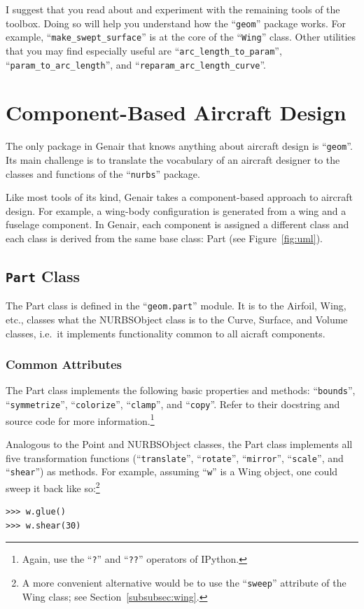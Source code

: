 \documentclass[]{article}
\begin{document}
I suggest that you read about and experiment with the remaining tools of 
the toolbox.  Doing so will help you understand how the 
``\texttt{geom}'' package works.  For example, 
``\texttt{make\_swept\_surface}'' is at the core of the 
``\texttt{Wing}'' class.  Other utilities that you may find especially 
useful are ``\texttt{arc\_length\_to\_param}'', 
``\texttt{param\_to\_arc\_length}'', and 
``\texttt{reparam\_arc\_length\_curve}''.


\section{Component-Based Aircraft Design}
\label{cha:geom}

The only package in Genair that knows anything about aircraft design is 
``\texttt{geom}''.  Its main challenge is to translate the vocabulary of 
an aircraft designer to the classes and functions of the 
``\texttt{nurbs}'' package.

Like most tools of its kind, Genair takes a component-based approach to 
aircraft design.  For example, a wing-body configuration is generated 
from a wing and a fuselage component.  In Genair, each component is 
assigned a different class and each class is derived from the same base 
class: Part (see Figure~\ref{fig:uml}).

\subsection{\texttt{Part} Class}
\label{subsec:part}

The Part class is defined in the ``\texttt{geom.part}'' module.  It is 
to the Airfoil, Wing, etc., classes what the NURBSObject class is to the 
Curve, Surface, and Volume classes, i.e.\ it implements functionality 
common to all aicraft components.

\subsubsection{Common Attributes}
\label{subsubsec:methods}

The Part class implements the following basic properties and methods: 
``\texttt{bounds}'', ``\texttt{symmetrize}'', ``\texttt{colorize}'', 
``\texttt{clamp}'', and ``\texttt{copy}''.  Refer to their docstring and 
source code for more information.\footnote{Again, use the ``\texttt{?}'' 
and ``\texttt{??}'' operators of IPython.}

Analogous to the Point and NURBSObject classes, the Part class 
implements all five transformation functions (``\texttt{translate}'', 
``\texttt{rotate}'', ``\texttt{mirror}'', ``\texttt{scale}'', and 
``\texttt{shear}'')  as methods.  For example, assuming ``\texttt{w}'' 
is a Wing object, one could sweep it back like so:\footnote{A more 
convenient alternative would be to use the ``\texttt{sweep}'' attribute 
of the Wing class; see Section~\ref{subsubsec:wing}.}
\begin{verbatim}
>>> w.glue()
>>> w.shear(30)
\end{verbatim}
\end{document}
